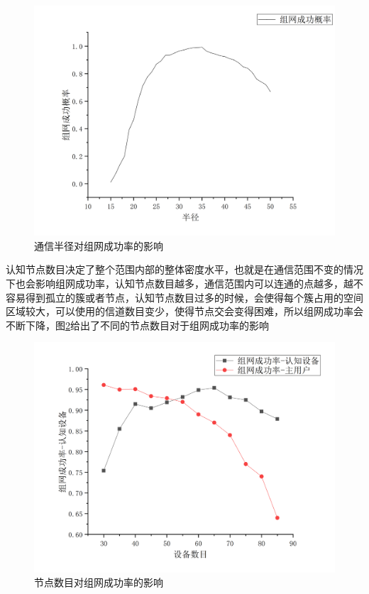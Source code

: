\documentclass[a4paper,AutoFakeBold,oneside,12pt]{book}
\begin{document}
  \begin{figure}[htbp]
\centering %
\includegraphics[scale=0.3]{pictures/R-successp.png} 
\caption{通信半径对组网成功率的影响} %
\label{R-successp}
\end{figure}
  
  认知节点数目决定了整个范围内部的整体密度水平，也就是在通信范围不变的情况下也会影响组网成功率，认知节点数目越多，通信范围内可以连通的点越多，越不容易得到孤立的簇或者节点，认知节点数目过多的时候，会使得每个簇占用的空间区域较大，可以使用的信道数目变少，使得节点交会变得困难，所以组网成功率会不断下降，图\ref{CRPU-SUCCESS}给出了不同的节点数目对于组网成功率的影响
    \begin{figure}[htbp]
\centering %
\includegraphics[scale=0.3]{pictures/CRPU-SUCCESS.png} 
\caption{节点数目对组网成功率的影响} %
\label{CRPU-SUCCESS}
\end{figure}
\end{document}
